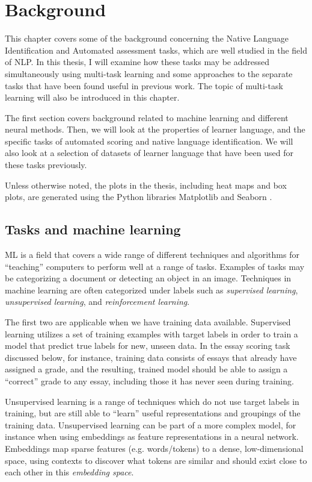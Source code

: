 \chapter{Background} \label{ch:background}

This chapter covers some of the background concerning the Native Language
Identification and Automated assessment tasks, which are well studied in the
field of \ac{NLP}. In this thesis, I will examine how these tasks
may be addressed simultaneously using multi-task learning and some approaches
to the separate tasks that have been found useful in previous work. The topic
of multi-task learning will also be introduced in this chapter.

The first section covers background related to machine learning and different
neural methods. Then, we will look at the properties of learner language, and
the specific tasks of automated scoring and native language identification.
We will also look at a selection of datasets of learner language that have
been used for these tasks previously.

Unless otherwise noted, the plots in the thesis, including heat maps and box
plots, are generated using the Python libraries Matplotlib
\autocite{matplotlib} and Seaborn \autocite{seaborn}.


\section{Tasks and machine learning}

\ac{ML} is a field that covers a wide range of different
techniques and algorithms for ``teaching'' computers to perform well at a
range of tasks. Examples of tasks may be categorizing a document or detecting
an object in an image. Techniques in machine learning are often categorized
under labels such as \emph{supervised learning}, \emph{unsupervised
learning}, and \emph{reinforcement learning}.

The first two are applicable when we have training data available. Supervised
learning utilizes a set of training examples with target labels in order to
train a model that predict true labels for new, unseen data. In the essay
scoring task discussed below, for instance, training data consists of essays
that already have assigned a grade, and the resulting, trained model should
be able to assign a ``correct'' grade to any essay, including those it has
never seen during training.

Unsupervised learning is a range of techniques which do not use target labels
in training, but are still able to ``learn'' useful representations and
groupings of the training data. Unsupervised learning can be part of a more
complex model, for instance when using embeddings as feature representations
in a neural network. Embeddings map sparse features (e.g. words/tokens) to a
dense, low-dimensional space, using contexts to discover what tokens are
similar and should exist close to each other in this \emph{embedding space}.

